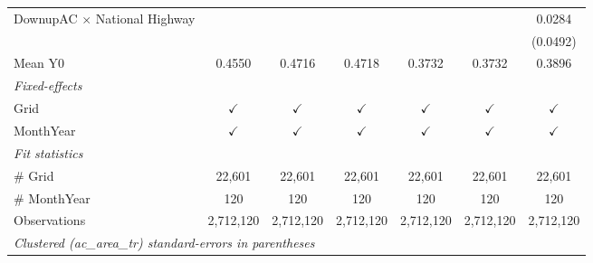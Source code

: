 \begin{table}[htbp]
\begin{tabular}{lcccccc}
      DownupAC $\times$ National Highway                         &               &               &               &               &               & 0.0284\\   
                                                                 &               &               &               &               &               & (0.0492)\\   
      \hline Mean Y0                                             & 0.4550        & 0.4716        & 0.4718        & 0.3732        & 0.3732        & 0.3896\\  
      \midrule
      \emph{Fixed-effects}\\
      Grid                                                       & $\checkmark$  & $\checkmark$  & $\checkmark$  & $\checkmark$  & $\checkmark$  & $\checkmark$\\   
      MonthYear                                                  & $\checkmark$  & $\checkmark$  & $\checkmark$  & $\checkmark$  & $\checkmark$  & $\checkmark$\\   
      \midrule
      \emph{Fit statistics}\\
      \# Grid                                                    & 22,601        & 22,601        & 22,601        & 22,601        & 22,601        & 22,601\\  
      \# MonthYear                                               & 120           & 120           & 120           & 120           & 120           & 120\\  
      Observations                                               & 2,712,120     & 2,712,120     & 2,712,120     & 2,712,120     & 2,712,120     & 2,712,120\\  
      \midrule \midrule
      \multicolumn{7}{l}{\emph{Clustered (ac\_area\_tr) standard-errors in parentheses}}\\
   \end{tabular}
\end{table}


